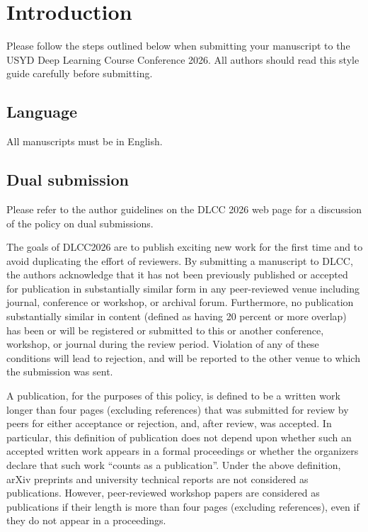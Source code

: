 \section{Introduction}

Please follow the steps outlined below when submitting your manuscript to the USYD Deep Learning Course Conference 2026.
All authors should read this style guide carefully before submitting.

\subsection{Language}

All manuscripts must be in English.

\subsection{Dual submission}

Please refer to the author guidelines on the DLCC 2026 web page for a discussion of the policy on dual submissions.

The goals of DLCC2026 are to publish exciting new work for the first time and to avoid duplicating the effort of reviewers.
By submitting a manuscript to DLCC, the authors acknowledge that it has not been previously published or accepted for publication in substantially similar form in any peer-reviewed venue including journal, conference or workshop, or archival forum.
Furthermore, no publication substantially similar in content (defined as having 20 percent or more overlap) has been or will be registered or submitted to this or another conference, workshop, or journal during the review period.
Violation of any of these conditions will lead to rejection, and will be reported to the other venue to which the submission was sent.

A publication, for the purposes of this policy, is defined to be a written work longer than four pages (excluding references) that was submitted for review by peers for either acceptance or rejection, and, after review, was accepted.
In particular, this definition of publication does not depend upon whether such an accepted written work appears in a formal proceedings or whether the organizers declare that such work “counts as a publication”.
Under the above definition, arXiv preprints and university technical reports are not considered as publications.
However, peer-reviewed workshop papers are considered as publications if their length is more than four pages (excluding references), even if they do not appear in a proceedings.

